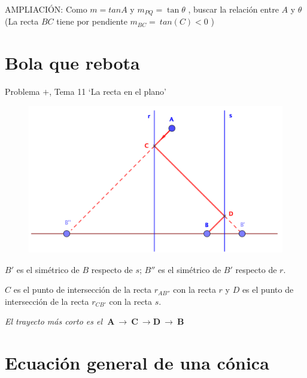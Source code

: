 AMPLIACIÓN:   Como  $m=tan A$   y   $m_{PQ}=\tan \theta$ ,   buscar la relación entre  $A$  y  $\theta$ (La recta $BC$ tiene por pendiente  $m_{BC}=\ tan(C)<0$ )






\chapter{Bola que rebota}\label{simetricos}

Problema $\boldsymbol{+}$, Tema 11 `La recta en el plano'

\vspace{10mm}

\begin{figure}[H]
	\centering
	\includegraphics[width=1\textwidth]{img-ga/simetricos.png}
\end{figure}

\vspace{5mm}

$B'$ es el simétrico de $B$ respecto de $s$; $B''$ es el simétrico de $B'$ respecto de $r$.

$C$ es el punto de intersección de la recta $r_{AB''}$ con la recta $r$ y $D$ es el punto de intersección de la recta $r_{CB'}$ con la recta $s$.

\emph{El trayecto más corto es el $\boldsymbol{ \ A \ \to \ C \ \to D \ \to \ B }$}



\chapter{Ecuación general de una cónica} \label{fcuadraticas}


